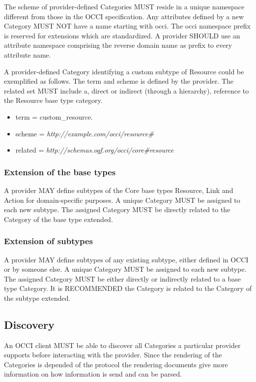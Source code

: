 \documentclass[10pt,a4paper]{article}
\begin{document}
The scheme of provider-defined Categories MUST reside in a unique namespace different from those in the OCCI specification. Any attributes defined by a new Category MUST NOT have a name starting with occi. The occi namespace prefix is reserved for extensions which are standardized. A provider SHOULD use an attribute namespace comprising the reverse domain name as prefix to every attribute name.

A provider-defined Category identifying a custom subtype of Resource could be exemplified as follows. The term and scheme is defined by the provider. The related set MUST include a, direct or indirect (through a hierarchy), reference to the Resource base type category.

\begin{itemize}
\item term = custom\_resource.
\item scheme = \textit{http://example.com/occi/resource\#}
\item related = \textit{http://schemas.ogf.org/occi/core\#resource}
\end{itemize}

\subsubsection{Extension of the base types}
A provider MAY define subtypes of the Core base types Resource, Link and Action for domain-specific purposes. A unique Category MUST be assigned to each new subtype. The assigned Category MUST be directly related to the Category of the base type extended.

\subsubsection{Extension of subtypes}
A provider MAY define subtypes of any existing subtype, either defined in OCCI or by someone else. A unique Category MUST be assigned to each new subtype. The assigned Category MUST be either directly or indirectly related to a base type Category. It is RECOMMENDED the Category is related to the Category of the subtype extended.

\subsection{Discovery}
An OCCI client MUST be able to discover all Categories a particular provider supports before interacting with the provider. Since the rendering of the Categories is depended of the protocol the rendering documents give more information on how information is send and can be parsed.
\end{document}
